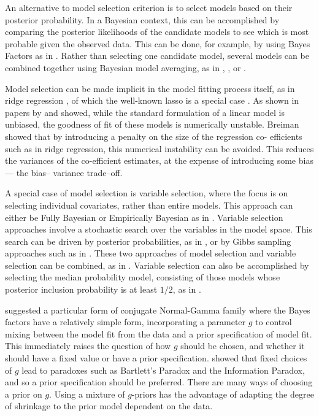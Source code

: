 \documentclass{amsart}[12pt]
\begin{document}
An alternative to model selection criterion is to select models based on their posterior probability. In a Bayesian context, this can be
accomplished by comparing the posterior likelihoods of the candidate models to see which is most probable
given the observed data. This can be done, for example, by using Bayes Factors as in \citep{Kass1993}. Rather
than selecting one candidate model, several models can be combined together using Bayesian model  averaging,
as in \citep{Hoeting1999}, \citep{Raftery1997}, \citep{Fernandez2001} or \citep{Papaspiliopoulos2016}.

Model selection can be made implicit in the model fitting process itself, as in ridge regression
\citep{Casella1980}, of which the well-known lasso is a special case \citep{Tibshirani1996}. As shown in
papers by \citep{Breiman1996} and \citep{Efron2013} showed, while  the standard formulation of a linear model
is unbiased, the goodness of fit of these models is numerically  unstable. Breiman showed that by introducing
a penalty on the size of the regression co- efficients such as  in ridge regression, this numerical
instability can be avoided. This reduces the variances of the co-efficient estimates, at the expense of
introducing some bias --- the bias-- variance trade--off.

A special case of model selection is variable selection, where the focus is on selecting individual
covariates, rather than entire models. This approach can either be Fully Bayesian or Empirically Bayesian as
in \citep{Cui2008}. Variable selection approaches involve a stochastic search over the variables in the model
space. This search can be driven by posterior probabilities, as in \citep{Casella2006}, or by Gibbs sampling
approaches such as in \citep{George1993}. These two approaches of model selection and variable selection can
be combined, as in \citep{Geweke1996}. Variable selection can also be accomplished by selecting the median
probability model, consisting of those models whose posterior inclusion probability is at least $1/2$, as in
\citep{Barbieri2004}.

\citep{Zellner1980} suggested a particular form of conjugate Normal-Gamma family where the Bayes factors have
a relatively simple form, incorporating a parameter $g$ to control mixing between the model fit from the data
and a prior specification of model fit. This immediately raises the question of how $g$ should be chosen, and
whether it should have a fixed value or have a prior specification. \citep{Liang2008} showed that fixed
choices of $g$ lead to paradoxes such as Bartlett's Paradox and the Information Paradox, and so a prior
specification should be preferred. There are many ways of choosing a prior on $g$. Using a mixture of
$g$-priors has the advantage of adapting the degree of shrinkage to the prior model dependent on the data.
\end{document}
